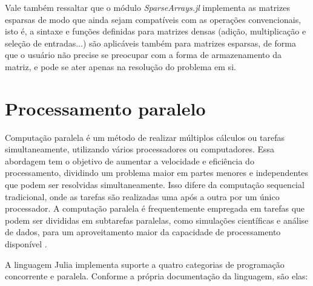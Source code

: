 Vale também ressaltar que o módulo \emph{SparseArrays.jl} implementa as matrizes esparsas de modo que ainda sejam compatíveis com as operações convencionais, isto é, a sintaxe e funções definidas para matrizes densas (adição, multiplicação e seleção de entradas...) são aplicáveis também para matrizes esparsas, de forma que o usuário não precise se preocupar com a forma de armazenamento da matriz, e pode se ater apenas na resolução do problema em si.

\section{Processamento paralelo}

Computação paralela é um método de realizar múltiplos cálculos ou tarefas simultaneamente, utilizando vários processadores ou computadores. Essa abordagem tem o objetivo de aumentar a velocidade e eficiência do processamento, dividindo um problema maior em partes menores e independentes que podem ser resolvidas simultaneamente. Isso difere da computação sequencial tradicional, onde as tarefas são realizadas uma após a outra por um único processador. A computação paralela é frequentemente empregada em tarefas que podem ser divididas em subtarefas paralelas, como simulações científicas e análise de dados, para um aproveitamento maior da capacidade de processamento disponível \cite{sli}.

A linguagem Julia implementa suporte a quatro categorias de programação concorrente e paralela. Conforme a própria documentação da linguagem, são elas:

